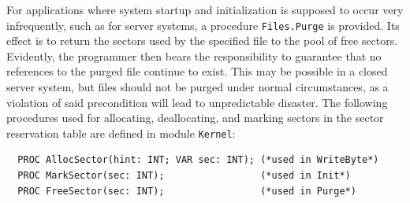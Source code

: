 For applications where system startup and initialization is supposed to occur very infrequently, such as
for server systems, a procedure \verb|Files.Purge| is provided. Its effect is to return the sectors used
by the specified file to the pool of free sectors. Evidently, the programmer then bears the
responsibility to guarantee that no references to the purged file continue to exist. This may be
possible in a closed server system, but files should not be purged under normal circumstances, as a
violation of said precondition will lead to unpredictable disaster.  The following procedures used for
allocating, deallocating, and marking sectors in the sector reservation table
are defined in module \verb|Kernel|:
\begin{verbatim}
  PROC AllocSector(hint: INT; VAR sec: INT); (*used in WriteByte*)
  PROC MarkSector(sec: INT);                 (*used in Init*)
  PROC FreeSector(sec: INT);                 (*used in Purge*)
\end{verbatim}
